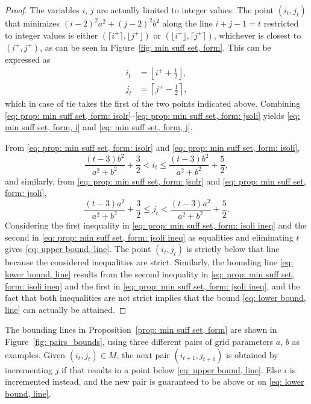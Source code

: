 \documentclass[12pt, a4paper]{article}
\newcommand{\tiles}{t} %
\newcommand{\isolr}{i^+}
\newcommand{\jsolr}{j^+}
\newcommand{\mss}{M}
\begin{document}
\begin{proof}
The variables $i$, $j$ are actually limited to integer values. The point $(i_\tiles, j_\tiles)$ that minimizes $(i-2)^2 a^2 + (j-2)^2 b^2$ along the line $i+j-1=\tiles$ restricted to integer values is either $(\lceil \isolr \rceil, \lfloor \jsolr \rfloor)$ or $(\lfloor \isolr \rfloor, \lceil \jsolr \rceil)$, whichever is closest to $(\isolr, \jsolr)$, as can be seen in Figure~\ref{fig: min suff set, form}. This can be expressed as
\begin{align}
\label{eq: prop: min suff set, form: isoli}
i_\tiles &= \left\lfloor \isolr + \frac 1 2 \right\rfloor, \\
\label{eq: prop: min suff set, form: jsoli}
j_\tiles &= \left\lceil \jsolr - \frac 1 2 \right\rceil,
\end{align}
which in case of tie takes the first of the two points indicated above. Combining \eqref{eq: prop: min suff set, form: isolr}--\eqref{eq: prop: min suff set, form: jsoli}
yields \eqref{eq: min suff set, form, i} and \eqref{eq: min suff set, form, j}.

From \eqref{eq: prop: min suff set, form: isolr} and \eqref{eq: prop: min suff set, form: isoli},
\begin{equation}
\label{eq: prop: min suff set, form: isoli ineq}
\frac{(t-3)b^2}{a^2+b^2} + \frac 3 2 < i_\tiles \leq \frac{(t-3)b^2}{a^2+b^2} + \frac 5 2,
\end{equation}
and similarly, from \eqref{eq: prop: min suff set, form: jsolr} and \eqref{eq: prop: min suff set, form: jsoli},
\begin{equation}
\label{eq: prop: min suff set, form: jsoli ineq}
\frac{(t-3)a^2}{a^2+b^2} + \frac 3 2 \leq j_\tiles < \frac{(t-3)a^2}{a^2+b^2} + \frac 5 2.
\end{equation}
Considering the first inequality in \eqref{eq: prop: min suff set, form: isoli ineq} and the second in \eqref{eq: prop: min suff set, form: jsoli ineq} as equalities and eliminating $\tiles$ gives \eqref{eq: upper bound, line}. The point $(i_\tiles, j_\tiles)$ is strictly below that line because the considered inequalities are strict. Similarly, the bounding line \eqref{eq: lower bound, line} results from the second inequality in \eqref{eq: prop: min suff set, form: isoli ineq} and the first in \eqref{eq: prop: min suff set, form: jsoli ineq}, and the fact that both inequalities are not strict implies that the bound \eqref{eq: lower bound, line} can actually be attained.
\end{proof}

The bounding lines in Proposition~\ref{prop: min suff set, form} are shown in Figure~\ref{fig: pairs_bounds}, using three different pairs of grid parameters $a$, $b$ as examples. Given $(i_\tiles,j_\tiles) \in \mss$, the next pair $(i_{\tiles+1},j_{\tiles+1})$ is obtained by incrementing $j$ if that results in a point below \eqref{eq: upper bound, line}. Else $i$ is incremented instead, and the new pair is guaranteed to be above or on \eqref{eq: lower bound, line}.
\end{document}
